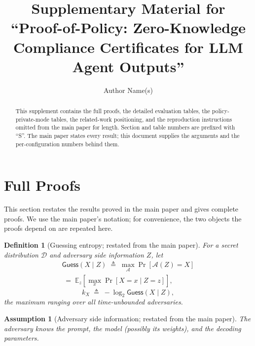 \documentclass[10pt,journal,compsoc]{IEEEtran}
\newtheorem{definition}[theorem]{Definition}
\newtheorem{assumption}[theorem]{Assumption}
\begin{document}
\title{Supplementary Material for\\``Proof-of-Policy: Zero-Knowledge Compliance
Certificates for LLM Agent Outputs''}
\author{Author Name(s)}
\maketitle

\begin{abstract}
This supplement contains the full proofs, the detailed evaluation tables, the
policy-private-mode tables, the related-work positioning, and the reproduction
instructions omitted from the main paper for length. Section and table numbers
are prefixed with ``S''. The main paper states every result; this document
supplies the arguments and the per-configuration numbers behind them.
\end{abstract}

\section{Full Proofs}
\label{app:proofs}

This section restates the results proved in the main paper and gives complete
proofs. We use the main paper's notation; for convenience, the two objects the
proofs depend on are repeated here.

\begin{definition}[Guessing entropy; restated from the main paper]
\label{def:k}
For a secret distribution $\mathcal{D}$ and adversary side information $Z$, let
\begin{multline*}
\mathsf{Guess}(X \mid Z) \;\triangleq\; \max_{\mathcal{A}} \Pr[\mathcal{A}(Z) = X]\\
\;=\; \mathbb{E}_z\!\left[\max_x \Pr[X = x \mid Z = z]\right],
\end{multline*}
\[
k_X \;\triangleq\; -\log_2 \mathsf{Guess}(X \mid Z),
\]
the maximum ranging over all time-unbounded adversaries.
\end{definition}

\begin{assumption}[Adversary side information; restated from the main paper]
\label{as:Z}
The adversary knows the prompt, the model (possibly its weights), and the
decoding parameters.
\end{assumption}
\end{document}
